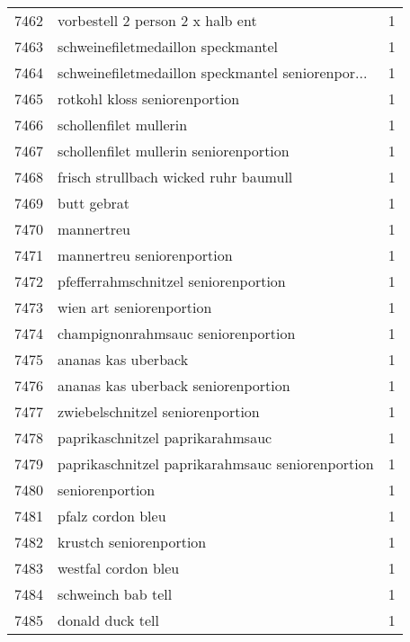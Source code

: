 \begin{tabular}{llr}
7462 &                   vorbestell 2 person 2 x halb ent &      1 \\
7463 &                 schweinefiletmedaillon speckmantel &      1 \\
7464 &  schweinefiletmedaillon speckmantel seniorenpor... &      1 \\
7465 &                      rotkohl kloss seniorenportion &      1 \\
7466 &                             schollenfilet mullerin &      1 \\
7467 &             schollenfilet mullerin seniorenportion &      1 \\
7468 &              frisch strullbach wicked ruhr baumull &      1 \\
7469 &                                        butt gebrat &      1 \\
7470 &                                         mannertreu &      1 \\
7471 &                         mannertreu seniorenportion &      1 \\
7472 &               pfefferrahmschnitzel seniorenportion &      1 \\
7473 &                           wien art seniorenportion &      1 \\
7474 &                 champignonrahmsauc seniorenportion &      1 \\
7475 &                                ananas kas uberback &      1 \\
7476 &                ananas kas uberback seniorenportion &      1 \\
7477 &                   zwiebelschnitzel seniorenportion &      1 \\
7478 &                   paprikaschnitzel paprikarahmsauc &      1 \\
7479 &   paprikaschnitzel paprikarahmsauc seniorenportion &      1 \\
7480 &                                    seniorenportion &      1 \\
7481 &                                  pfalz cordon bleu &      1 \\
7482 &                            krustch seniorenportion &      1 \\
7483 &                                westfal cordon bleu &      1 \\
7484 &                                 schweinch bab tell &      1 \\
7485 &                                   donald duck tell &      1 \\

\end{tabular}
